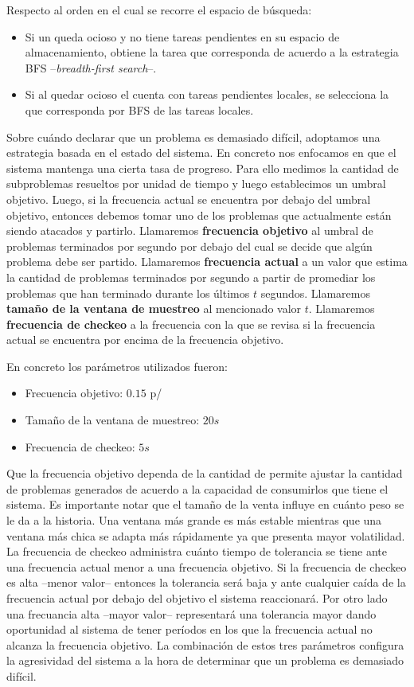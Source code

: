 Respecto al orden en el cual se recorre el espacio de búsqueda:

\begin{itemize}
	\item Si un \w queda ocioso y no tiene tareas pendientes en su espacio de almacenamiento, obtiene la tarea que corresponda de acuerdo a la estrategia BFS --\emph{breadth-first search}--.
	\item Si al quedar ocioso el \w cuenta con tareas pendientes locales, se selecciona la que corresponda por BFS de las tareas locales.
\end{itemize}

Sobre cuándo declarar que un problema es demasiado difícil, adoptamos una
estrategia basada en el estado del sistema. En concreto nos enfocamos en que
el sistema mantenga una cierta tasa de progreso. Para ello medimos la cantidad
de subproblemas resueltos por unidad de tiempo y luego establecimos un umbral
objetivo. Luego, si la frecuencia actual se encuentra por debajo del umbral
objetivo, entonces debemos tomar uno de los problemas que actualmente están
siendo atacados y partirlo. Llamaremos \textbf{frecuencia objetivo} al umbral
de problemas terminados por segundo por debajo del cual se decide que algún
problema debe ser partido. Llamaremos \textbf{frecuencia actual} a un valor
que estima la cantidad de problemas terminados por segundo a partir de
promediar los problemas que han terminado durante los últimos $t$ segundos.
Llamaremos \textbf{tamaño de la ventana de muestreo} al mencionado valor $t$.
Llamaremos \textbf{frecuencia de checkeo} a la frecuencia con la que se revisa
si la frecuencia actual se encuentra por encima de la frecuencia objetivo.

En concreto los parámetros utilizados fueron:

\begin{itemize}
	\item Frecuencia objetivo: $0.15$ p/\w
	\item Tamaño de la ventana de muestreo: $20s$
	\item Frecuencia de checkeo: $5s$
\end{itemize}

Que la frecuencia objetivo dependa de la cantidad de \ws permite ajustar la
cantidad de problemas generados de acuerdo a la capacidad de consumirlos que
tiene el sistema. Es importante notar que el tamaño de la venta influye en
cuánto peso se le da a la historia. Una ventana más grande es más estable
mientras que una ventana más chica se adapta más rápidamente ya que presenta
mayor volatilidad. La frecuencia de checkeo administra cuánto tiempo de
tolerancia se tiene ante una frecuencia actual menor a una frecuencia
objetivo. Si la frecuencia de checkeo es alta --menor valor-- entonces la
tolerancia será baja y ante cualquier caída de la frecuencia actual por debajo
del objetivo el sistema reaccionará. Por otro lado una frecuancia alta --mayor
valor-- representará una tolerancia mayor dando oportunidad al sistema de
tener períodos en los que la frecuencia actual no alcanza la frecuencia
objetivo. La combinación de  estos tres parámetros configura la agresividad
del sistema a la hora de determinar que un problema es demasiado difícil.


